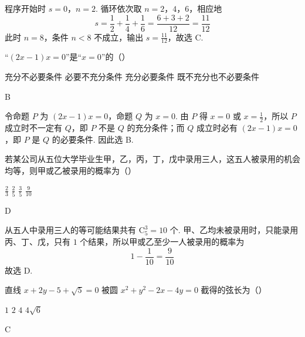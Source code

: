 \begin{solution}
程序开始时 \(s=0\)，\(n=2\). 循环依次取 \(n=2\)，\(4\)，\(6\)，相应地
\[
s=\frac12+\frac14+\frac16=\frac{6+3+2}{12}=\frac{11}{12}
\]
此时 \(n=8\)，条件 \(n<8\) 不成立，输出 \(s=\frac{11}{12}\)，故选 C.
\end{solution}

\begin{problem}
“\((2x - 1)x = 0\)”是“\(x = 0\)”的（\quad）

\choices
    {充分不必要条件}
    {必要不充分条件}
    {充分必要条件}
    {既不充分也不必要条件}
\end{problem}

\begin{answer}
B
\end{answer}

\begin{solution}
令命题 \(P\) 为 \((2x-1)x=0\)，命题 \(Q\) 为 \(x=0\). 由 \(P\) 得 \(x=0\) 或 \(x=\frac12\)，所以 \(P\) 成立时不一定有 \(Q\)，即 \(P\) 不是 \(Q\) 的充分条件；而 \(Q\) 成立时必有 \((2x-1)x=0\)，即 \(P\) 是 \(Q\) 的必要条件. 因此选 B.
\end{solution}

\begin{problem}
若某公司从五位大学毕业生甲，乙，丙，丁，戊中录用三人，这五人被录用的机会均等，则甲或乙被录用的概率为（\quad）

\choices
    {\( \frac{2}{3} \)}
    {\( \frac{2}{5} \)}
    {\( \frac{3}{5} \)}
    {\( \frac{9}{10} \)}
\end{problem}

\begin{answer}
D
\end{answer}

\begin{solution}
从五人中录用三人的等可能结果共有 \(\mathrm C_5^3=10\) 个. 甲、乙均未被录用时，只能录用丙、丁、戊，只有 \(1\) 个结果，所以甲或乙至少一人被录用的概率为
\[
1-\frac{1}{10}=\frac{9}{10}
\]
故选 D.
\end{solution}

\begin{problem}
直线 \(x + 2y - 5 + \sqrt{5} = 0\) 被圆 \(x^{2} + y^{2} - 2x - 4y = 0\) 截得的弦长为（\quad）

\choices
    {\(1\)}
    {\(2\)}
    {\(4\)}
    {\( 4\sqrt{6} \)}
\end{problem}

\begin{answer}
C
\end{answer}


